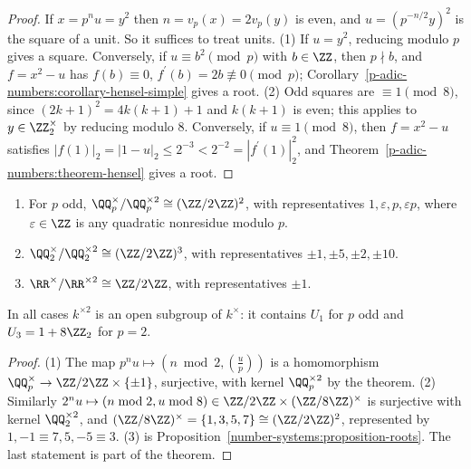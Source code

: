 \begin{proof}
If $x = p^nu = y^2$ then $n = v_p(x) = 2v_p(y)$ is even, and $u = (p^{-n/2}y)^2$ is the square of a unit. So it suffices to treat units.
(1) If $u = y^2$, reducing modulo $p$ gives a square. Conversely, if $u \equiv b^2 \pmod p$ with $b \in \ZZ$, then $p \nmid b$, and $f = x^2 - u$ has $f(b) \equiv 0$, $f^{\prime}(b) = 2b \not\equiv 0 \pmod p$;
Corollary~\ref{p-adic-numbers:corollary-hensel-simple} gives a root.
(2) Odd squares are $\equiv 1 \pmod 8$, since $(2k + 1)^2 = 4k(k + 1) + 1$ and $k(k + 1)$ is even; this applies to $y \in \ZZ_2^\times$ by reducing modulo $8$. Conversely, if $u \equiv 1 \pmod 8$, then
$f = x^2 - u$ satisfies $|f(1)|_2 = |1 - u|_2 \leq 2^{-3} < 2^{-2} = |f^{\prime}(1)|_2^2$, and Theorem~\ref{p-adic-numbers:theorem-hensel} gives a root.
\end{proof}

\begin{corollary}\label{p-adic-numbers:corollary-square-classes}
\begin{enumerate}
\item For $p$ odd, $\QQ_p^\times/\QQ_p^{\times2} \cong (\ZZ/2\ZZ)^2$, with representatives $1, \varepsilon, p, \varepsilon p$, where $\varepsilon \in \ZZ$ is any quadratic nonresidue modulo $p$.
\item $\QQ_2^\times/\QQ_2^{\times2} \cong (\ZZ/2\ZZ)^3$, with representatives $\pm1, \pm5, \pm2, \pm10$.
\item $\RR^\times/\RR^{\times2} \cong \ZZ/2\ZZ$, with representatives $\pm1$.
\end{enumerate}
In all cases $k^{\times2}$ is an open subgroup of $k^\times$: it contains $U_1$ for $p$ odd and $U_3 = 1 + 8\ZZ_2$ for $p = 2$.
\end{corollary}

\begin{proof}
(1) The map $p^nu \mapsto (n \bmod 2, (\frac up))$ is a homomorphism $\QQ_p^\times \to \ZZ/2\ZZ \times \{\pm1\}$, surjective, with kernel $\QQ_p^{\times2}$ by the theorem. (2) Similarly
$2^nu \mapsto (n \bmod 2, u \bmod 8) \in \ZZ/2\ZZ \times (\ZZ/8\ZZ)^\times$ is surjective with kernel $\QQ_2^{\times2}$, and $(\ZZ/8\ZZ)^\times = \{1, 3, 5, 7\} \cong (\ZZ/2\ZZ)^2$, represented by
$1, -1 \equiv 7, 5, -5 \equiv 3$. (3) is Proposition~\ref{number-systems:proposition-roots}. The last statement is part of the theorem.
\end{proof}

